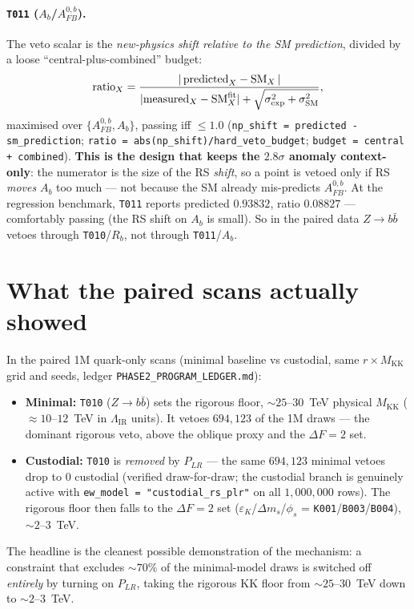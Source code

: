 \documentclass[11pt]{article}
\newcommand{\MKK}{M_{\mathrm{KK}}}
\newcommand{\LIR}{\Lambda_{\mathrm{IR}}}
\newcommand{\eps}{\varepsilon}
\newcommand{\PLR}{P_{LR}}
\newcommand{\code}[1]{\texttt{#1}}
\newcommand{\Afb}{A_{FB}^{0,b}}
\theoremstyle{definition}
\begin{document}
\paragraph{\code{T011} ($A_b$/$\Afb$).} The veto scalar is the
\emph{new-physics shift relative to the SM prediction}, divided by a loose
``central-plus-combined'' budget:
\begin{equation}
\text{ratio}_X = \frac{|\,\text{predicted}_X - \text{SM}_X\,|}{|\text{measured}_X - \text{SM}^{\rm fit}_X| + \sqrt{\sigma_{\rm exp}^2 + \sigma_{\rm SM}^2}},
\end{equation}
maximised over $\{\Afb, A_b\}$, passing iff $\le 1.0$ (\code{np\_shift =
predicted - sm\_prediction}; \code{ratio = abs(np\_shift)/hard\_veto\_budget};
\code{budget = central + combined}). \textbf{This is the design that keeps the
$2.8\sigma$ anomaly context-only}: the numerator is the size of the RS
\emph{shift}, so a point is vetoed only if RS \emph{moves} $A_b$ too much --- not
because the SM already mis-predicts $\Afb$. At the regression benchmark,
\code{T011} reports predicted $0.93832$, ratio $0.08827$ --- comfortably passing
(the RS shift on $A_b$ is small). So in the paired data $Z\to b\bar b$ vetoes
through \code{T010}/$R_b$, not through \code{T011}/$A_b$.

\section{What the paired scans actually showed}
\label{sec:scans}

In the paired 1M quark-only scans (minimal baseline vs custodial, same
$r\times\MKK$ grid and seeds, ledger \code{PHASE2\_PROGRAM\_LEDGER.md}):
\begin{itemize}[leftmargin=1.4em]
\item \textbf{Minimal:} \code{T010} ($Z\to b\bar b$) sets the rigorous floor,
$\sim 25$--$30$~TeV physical $\MKK$ ($\approx 10$--$12$~TeV in $\LIR$ units). It
vetoes $694{,}123$ of the 1M draws --- the dominant rigorous veto, above the
oblique proxy and the $\Delta F=2$ set.
\item \textbf{Custodial:} \code{T010} is \emph{removed} by $\PLR$ --- the same
$694{,}123$ minimal vetoes drop to \textbf{$0$} custodial (verified
draw-for-draw; the custodial branch is genuinely active with
\code{ew\_model = "custodial\_rs\_plr"} on all $1{,}000{,}000$ rows). The rigorous
floor then falls to the $\Delta F=2$ set ($\eps_K$/$\Delta m_s$/$\phi_s$ =
\code{K001}/\code{B003}/\code{B004}), $\sim 2$--$3$~TeV.
\end{itemize}
The headline is the cleanest possible demonstration of the mechanism: a
constraint that excludes $\sim 70\%$ of the minimal-model draws is switched off
\emph{entirely} by turning on $\PLR$, taking the rigorous KK floor from
$\sim 25$--$30$~TeV down to $\sim 2$--$3$~TeV.
\end{document}
